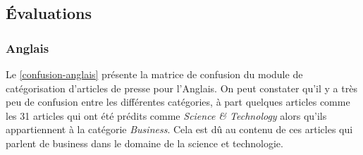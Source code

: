 \subsection{Évaluations}
    \subsubsection{Anglais}
    Le \autoref{confusion-anglais} présente la matrice de confusion du module de catégorisation d'articles de presse pour l'Anglais. On peut constater qu'il y a très peu de confusion entre les différentes catégories, à part quelques articles comme les 31 articles qui ont été prédits comme \emph{Science \& Technology} alors qu'ils appartiennent à la catégorie \emph{Business}. Cela est dû au contenu de ces articles qui parlent de business dans le domaine de la science et technologie. 

